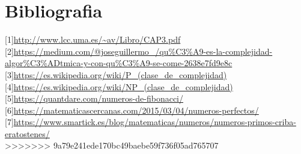 \documentclass[spanish]{article}
\begin{document}
	\section{Bibliografia}
	{[}1{]}\url{http://www.lcc.uma.es/~av/Libro/CAP3.pdf}\\
	{[}2{]}\url{https://medium.com/@joseguillermo_/qu%C3%A9-es-la-complejidad-algor%C3%ADtmica-y-con-qu%C3%A9-se-come-2638e7fd9e8c}\\
		{[}3{]}\url{https://es.wikipedia.org/wiki/P_(clase_de_complejidad)}\\
		{[}4{]}\url{https://es.wikipedia.org/wiki/NP_(clase_de_complejidad)}\\
		{[}5{]}\url{https://quantdare.com/numeros-de-fibonacci/}\\
		{[}6{]}\url{https://matematicascercanas.com/2015/03/04/numeros-perfectos/}\\
		{[}7{]}\url{https://www.smartick.es/blog/matematicas/numeros/numeros-primos-criba-eratostenes/}\\		
>>>>>>> 9a79e241ede170bc49baebe59f736f05ad765707
	
\end{document}

